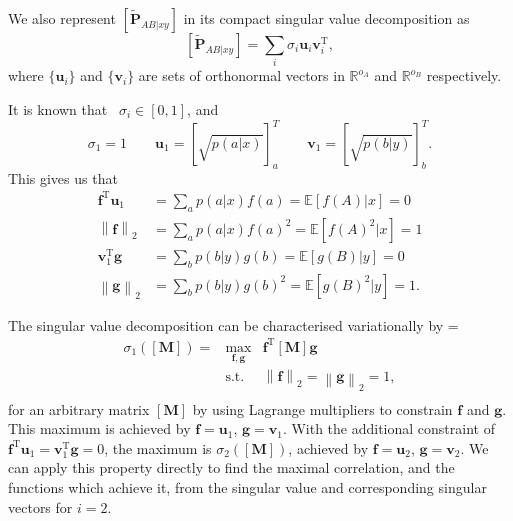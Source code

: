 \documentclass[10pt, a4paper]{article}
\numberwithin{equation}{section} %
\theoremstyle{definition}
\theoremstyle{plain}
\newenvironment{Array}[1] %
{\def\arraystretch{1.75}\everymath={\displaystyle}\begin{equation}\begin{array}{#1}}
{\end{array}\end{equation}}
\newcommand{\norm}[1]{\left\lVert#1\right\rVert}
\newcommand{\?}{\mathrel{?}} %
\newcommand{\R}{\mathbb{R}} %
\newcommand{\cvec}[1]{\boldsymbol{\mathbf{#1}}}    %
\newcommand{\rvec}[1]{\boldsymbol{\mathbf{#1}}^{\mathrm{T}}} %
\newcommand{\matr}[1]{\left[\mathbf{#1}\right]} %
\newcommand{\matrp}[2]{\left[\mathbf{#1}#2\right]} %
\newcommand{\E}{\mathbb{E}} %
\begin{document}
    We also represent \(\matrp{\tilde{P}}{_{AB|xy}}\) in its compact singular value decomposition as
    \begin{equation}
      \matrp{\tilde{P}}{_{AB|xy}} = \sum_i \sigma_i \cvec{u}_i \rvec{v}_i,
    \end{equation}
    where \(\{\cvec{u}_i\}\) and \(\{\cvec{v}_i\}\) are sets of orthonormal vectors in \(\R^{o_A}\) and \(\R^{o_B}\) respectively.

    It is known that~\cite[Thm 1]{ComputingMaxCorr} \(\sigma_i \in [0, 1]\), and
    \begin{equation}
      \sigma_1 = 1 \qquad \cvec{u}_1 = {[\sqrt{p(a|x)}]}_a^T \qquad \cvec{v}_1 = {[\sqrt{p(b|y)}]}_b^T.
    \end{equation}
    This gives us that
    \begin{align}
      \rvec{f} \cvec{u}_1 &= \sum_a p(a|x) f(a) = \E[f(A)|x] = 0 \\
      \norm{\cvec{f}}_2 &= \sum_a p(a|x) {f(a)}^2 = \E[{f(A)}^2|x] = 1 \\
      \rvec{v}_1 \cvec{g} &= \sum_b p(b|y) g(b) = \E[g(B)|y] = 0 \\
      \norm{\cvec{g}}_2 &= \sum_b p(b|y) {g(b)}^2 = \E[{g(B)}^2|y] = 1.
    \end{align}

    The singular value decomposition can be characterised variationally by
    \begin{Array}{rcl}
      \sigma_1(\matr{M}) = & \max_{\cvec{f},\cvec{g}} & \rvec{f} \matr{M} \cvec{g} \\
                            & \text{s.t.} & \norm{\cvec{f}}_2 = \norm{\cvec{g}}_2 = 1, \\
    \end{Array}
    for an arbitrary matrix \(\matr{M}\) by using Lagrange multipliers to constrain \(\cvec{f}\) and \(\cvec{g}\). This maximum is achieved by \(\cvec{f} = \cvec{u}_1\), \(\cvec{g} = \cvec{v}_1\). With the additional constraint of \(\rvec{f} \cvec{u}_1 = \rvec{v}_1 \cvec{g} = 0\), the maximum is \(\sigma_2(\matr{M})\), achieved by \(\cvec{f} = \cvec{u}_2\), \(\cvec{g} = \cvec{v}_2\). We can apply this property directly to find the maximal correlation, and the functions which achieve it, from the singular value and corresponding singular vectors for \(i = 2\).
\end{document}
